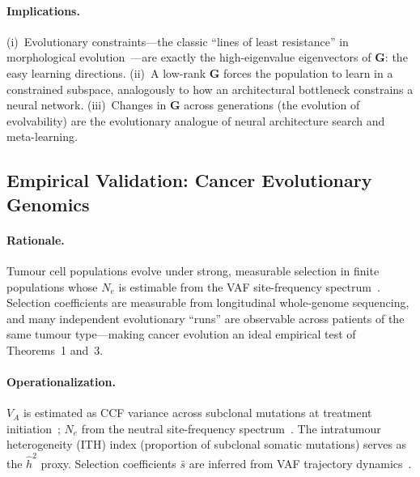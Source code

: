 \documentclass[12pt]{article}
\theoremstyle{remark}
\begin{document}
\paragraph{Implications.} (i)~Evolutionary constraints---the classic ``lines of least resistance'' in morphological evolution~\cite{schluter1996}---are exactly the high-eigenvalue eigenvectors of $\mathbf{G}$: the easy learning directions. (ii)~A low-rank $\mathbf{G}$ forces the population to learn in a constrained subspace, analogously to how an architectural bottleneck constrains a neural network. (iii)~Changes in $\mathbf{G}$ across generations (the evolution of evolvability) are the evolutionary analogue of neural architecture search and meta-learning.

\subsection{Empirical Validation: Cancer Evolutionary Genomics}

\paragraph{Rationale.} Tumour cell populations evolve under strong, measurable selection in finite populations whose $N_e$ is estimable from the VAF site-frequency spectrum~\cite{williams2016}. Selection coefficients are measurable from longitudinal whole-genome sequencing, and many independent evolutionary ``runs'' are observable across patients of the same tumour type---making cancer evolution an ideal empirical test of Theorems~1 and~3.

\paragraph{Operationalization.} $V_A$ is estimated as CCF variance across subclonal mutations at treatment initiation~\cite{dentro2021}; $N_e$ from the neutral site-frequency spectrum~\cite{williams2016}. The intratumour heterogeneity (ITH) index (proportion of subclonal somatic mutations) serves as the $\hat{h}^2$ proxy. Selection coefficients $\bar{s}$ are inferred from VAF trajectory dynamics~\cite{tarabichi2021}.
\end{document}
